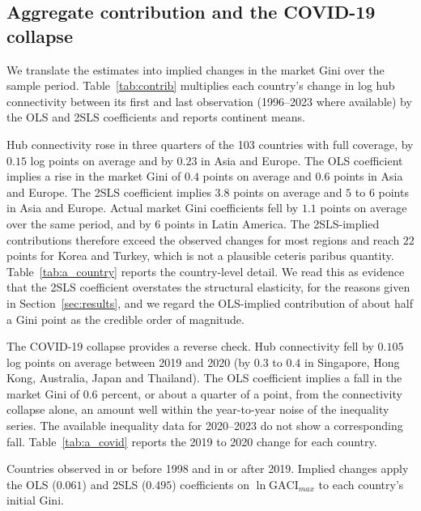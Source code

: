\documentclass[12pt]{article}
\begin{document}
\subsection{Aggregate contribution and the COVID-19 collapse}
\label{sec:contrib}
We translate the estimates into implied changes in the market Gini over the sample period. Table~\ref{tab:contrib} multiplies each country's change in log hub connectivity between its first and last observation (1996--2023 where available) by the OLS and 2SLS coefficients and reports continent means.

Hub connectivity rose in three quarters of the 103 countries with full coverage, by $0.15$ log points on average and by $0.23$ in Asia and Europe. The OLS coefficient implies a rise in the market Gini of $0.4$ points on average and $0.6$ points in Asia and Europe. The 2SLS coefficient implies $3.8$ points on average and $5$ to $6$ points in Asia and Europe. Actual market Gini coefficients fell by $1.1$ points on average over the same period, and by $6$ points in Latin America. The 2SLS-implied contributions therefore exceed the observed changes for most regions and reach $22$ points for Korea and Turkey, which is not a plausible ceteris paribus quantity. Table~\ref{tab:a_country} reports the country-level detail. We read this as evidence that the 2SLS coefficient overstates the structural elasticity, for the reasons given in Section~\ref{sec:results}, and we regard the OLS-implied contribution of about half a Gini point as the credible order of magnitude.

The COVID-19 collapse provides a reverse check. Hub connectivity fell by $0.105$ log points on average between 2019 and 2020 (by $0.3$ to $0.4$ in Singapore, Hong Kong, Australia, Japan and Thailand). The OLS coefficient implies a fall in the market Gini of $0.6$ percent, or about a quarter of a point, from the connectivity collapse alone, an amount well within the year-to-year noise of the inequality series. The available inequality data for 2020--2023 do not show a corresponding fall. Table~\ref{tab:a_covid} reports the 2019 to 2020 change for each country.

\begin{table}[H]\centering\caption{Implied contribution of hub-connectivity growth to the market Gini, first to last observation.}\label{tab:contrib}
\begin{threeparttable}\small
\begin{tablenotes}\footnotesize\item Countries observed in or before 1998 and in or after 2019. Implied changes apply the OLS ($0.061$) and 2SLS ($0.495$) coefficients on $\ln\mathrm{GACI}_{max}$ to each country's initial Gini.\end{tablenotes}\end{threeparttable}\end{table}
\end{document}
